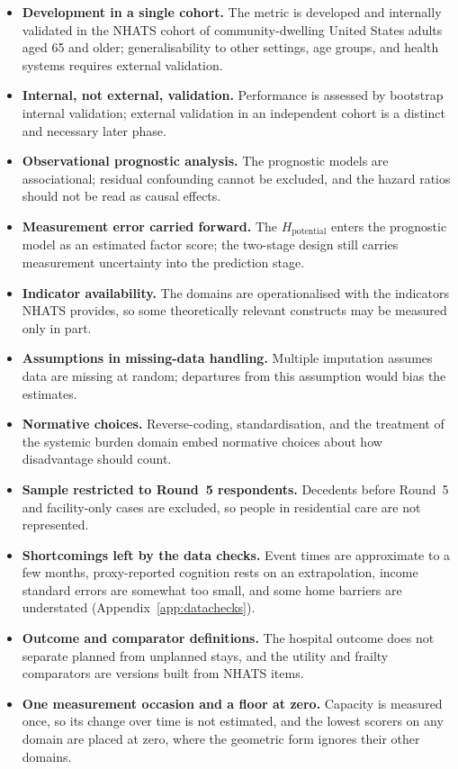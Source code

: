 \begin{itemize}
  \item \textbf{Development in a single cohort.} The metric is developed and internally validated in the NHATS cohort of community-dwelling United States adults aged 65 and older; generalisability to other settings, age groups, and health systems requires external validation.
  \item \textbf{Internal, not external, validation.} Performance is assessed by bootstrap internal validation; external validation in an independent cohort is a distinct and necessary later phase.
  \item \textbf{Observational prognostic analysis.} The prognostic models are associational; residual confounding cannot be excluded, and the hazard ratios should not be read as causal effects.
  \item \textbf{Measurement error carried forward.} The $H_{\text{potential}}$ enters the prognostic model as an estimated factor score; the two-stage design still carries measurement uncertainty into the prediction stage.
  \item \textbf{Indicator availability.} The domains are operationalised with the indicators NHATS provides, so some theoretically relevant constructs may be measured only in part.
  \item \textbf{Assumptions in missing-data handling.} Multiple imputation assumes data are missing at random; departures from this assumption would bias the estimates.
  \item \textbf{Normative choices.} Reverse-coding, standardisation, and the treatment of the systemic burden domain embed normative choices about how disadvantage should count.
  \item \textbf{Sample restricted to Round~5 respondents.} Decedents before Round~5 and facility-only cases are excluded, so people in residential care are not represented.
  \item \textbf{Shortcomings left by the data checks.} Event times are approximate to a few months, proxy-reported cognition rests on an extrapolation, income standard errors are somewhat too small, and some home barriers are understated (Appendix~\ref{app:datachecks}).
  \item \textbf{Outcome and comparator definitions.} The hospital outcome does not separate planned from unplanned stays, and the utility and frailty comparators are versions built from NHATS items.
  \item \textbf{One measurement occasion and a floor at zero.} Capacity is measured once, so its change over time is not estimated, and the lowest scorers on any domain are placed at zero, where the geometric form ignores their other domains.
\end{itemize}

